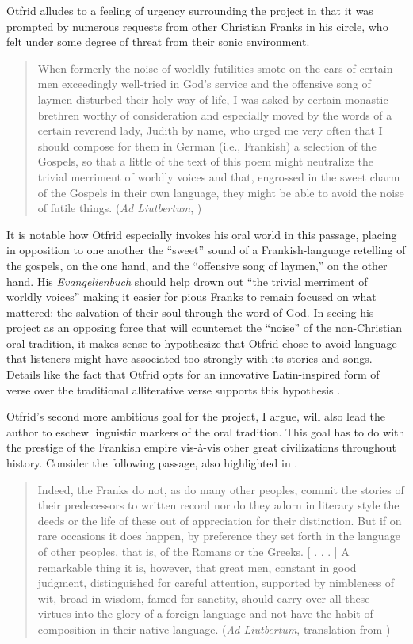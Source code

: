 \noindent Otfrid alludes to a feeling of urgency surrounding the project in that it was prompted by numerous requests from other Christian Franks in his circle, who felt under some degree of threat from their sonic environment.

\begin{quote}
When formerly the noise of worldly futilities smote on the ears of certain men exceedingly well-tried in God's service and the offensive song of laymen disturbed their holy way of life, I was asked by certain monastic brethren worthy of consideration and especially moved by the words of a certain reverend lady, Judith by name, who urged me very often that I should compose for them in German (i.e., Frankish) a selection of the Gospels, so that a little of the text of this poem might neutralize the trivial merriment of worldly voices and that, engrossed in the sweet charm of the Gospels in their own language, they might be able to avoid the noise of futile things. (\textit{Ad Liutbertum}, \citealt[873]{Magoun1943})
\end{quote}

\noindent It is notable how Otfrid especially invokes his oral world in this passage, placing in opposition to one another the “sweet” sound of a Frankish-language retelling of the gospels, on the one hand, and the “offensive song of laymen,” on the other hand. His \textit{Evangelienbuch} should help drown out “the trivial merriment of worldly voices” making it easier for pious Franks to remain focused on what mattered: the salvation of their soul through the word of God. In seeing his project as an opposing force that will counteract the “noise” of the non-Christian oral tradition, it makes sense to hypothesize that Otfrid chose to avoid language that listeners might have associated too strongly with its stories and songs. Details like the fact that Otfrid opts for an innovative Latin-inspired form of verse over the traditional alliterative verse supports this hypothesis \citep[35--38]{Somers2021b}.

Otfrid’s second more ambitious goal for the project, I argue, will also lead the author to eschew linguistic markers of the oral tradition. This goal has to do with the prestige of the Frankish empire vis-à-vis other great civilizations throughout history. Consider the following passage, also highlighted in \citet[37]{Somers2021b}.

\begin{quote}
Indeed, the Franks do not, as do many other peoples, commit the stories of their predecessors to written record nor do they adorn in literary style the deeds or the life of these out of appreciation for their distinction. But if on rare occasions it does happen, by preference they set forth in the language of other peoples, that is, of the Romans or the Greeks. [ . . . ] A remarkable thing it is, however, that great men, constant in good judgment, distinguished for careful attention, supported by nimbleness of wit, broad in wisdom, famed for sanctity, should carry over all these virtues into the glory of a foreign language and not have the habit of composition in their native language. (\textit{Ad Liutbertum}, translation from \citealt[886--887]{Magoun1943})
\end{quote}

